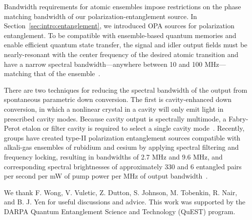 \documentclass[aps,twocolumn,secnumarabic,amsmath,amssymb,pra,groupedaddress,
showpacs, showkeys]{revtex4-1}
\begin{document}
Bandwidth requirements for atomic ensembles impose restrictions on the phase
matching bandwidth of our polarization-entanglement source. In
Section~\ref{sec:intro:entanglement}, we introduced OPA sources for
polarization entanglement. To be compatible with ensemble-based quantum
memories and enable efficient quantum state transfer, the signal and idler
output fields must be nearly-resonant with the center frequency of the desired
atomic transition and have a narrow spectral bandwidth---anywhere between 10
and 100 MHz---matching that of the ensemble~\cite{2009arXiv0906.2699S}. 

There are two techniques for reducing the spectral bandwidth of the output from
spontaneous parametric down conversion. The first is cavity-enhanced down
conversion, in which a nonlinear crystal in a cavity will only emit light in
prescribed cavity modes. Because cavity output is spectrally multimode, a
Fabry-Perot etalon or filter cavity is required to select a single cavity
mode~\cite{PhysRevLett.97.223601, PhysRevLett.102.063603}. Recently, groups
have created type-II polarization entanglement sources compatible with
alkali-gas ensembles of rubidium and cesium by applying spectral filtering and
frequency locking, resulting in bandwidths of 2.7 MHz and 9.6 MHz, and
corresponding spectral brightnesses of approximately 330 and 6 entangled pairs
per second per mW of pump power per MHz of output
bandwidth~\cite{scholz:201105, PhysRevLett.101.190501}.



\begin{acknowledgments}

  We thank F. Wong, V. Vuletic, Z. Dutton, S. Johnson, M. Tobenkin, R. Nair,
  and B. J. Yen for useful discussions and advice. This work was supported by
  the DARPA Quantum Entanglement Science and Technology (QuEST) program.

\end{acknowledgments}


\end{document}
